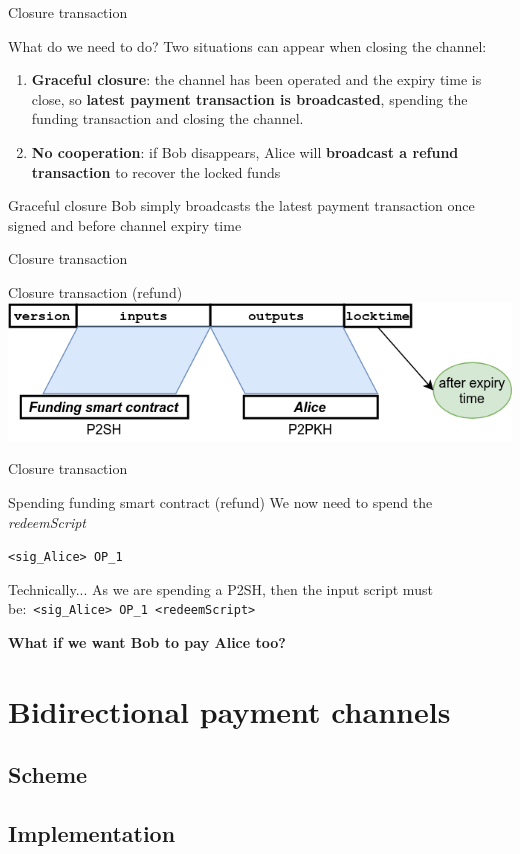 \documentclass{beamer}
\begin{document}
\begin{frame}{Closure transaction}
 \begin{block}{What do we need to do?}
  Two situations can appear when closing the channel:
  \begin{enumerate}[<+->]
   \item \textbf{Graceful closure}: the channel has been operated and the expiry time is close, so \textbf{latest payment transaction is broadcasted}, spending the funding transaction and closing the channel.
   \item \textbf{No cooperation}: if Bob disappears, Alice will \textbf{broadcast a refund transaction} to recover the locked funds
  \end{enumerate}
 \end{block}
 \pause
 \begin{exampleblock}{Graceful closure}
  Bob simply broadcasts the latest payment transaction once signed and before channel expiry time
 \end{exampleblock}
\end{frame}
\begin{frame}{Closure transaction}
 \begin{exampleblock}{Closure transaction (refund)}
  \includegraphics[width=\textwidth, height=0.8\textheight, keepaspectratio]{img/unidir_tx_refund.png}
 \end{exampleblock}
\end{frame}
\begin{frame}{Closure transaction}
 \begin{exampleblock}{Spending funding smart contract (refund)}
  We now need to spend the \textit{redeemScript}
  \pause
  \begin{center}
   \texttt{<sig\_Alice> OP\_1}
  \end{center}
 \end{exampleblock}
 \pause
 \begin{exampleblock}{Technically...}
  As we are spending a P2SH, then the input script must be:\
  \texttt{<sig\_Alice> OP\_1 <redeemScript>}
 \end{exampleblock}
\end{frame}
\begin{frame}
 \begin{center}
  \textbf{What if we want Bob to pay Alice too?}
 \end{center}
\end{frame}
\section{Bidirectional payment channels}
\subsection{Scheme}
\subsection{Implementation}
\end{document}
